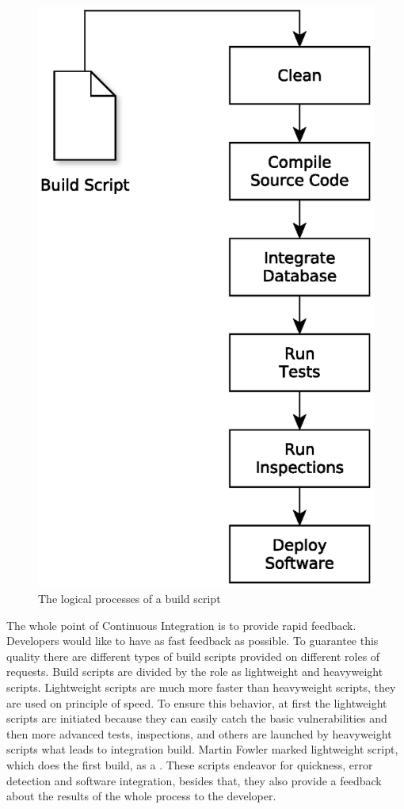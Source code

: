 \begin{figure}[H]
	\centering
	\includegraphics[scale=0.5]{yEd/the_logical_processes_of_a_build_script.eps}
	\caption{The logical processes of a build script\cite{CIPD}}
	\label{fig:lpobs}
\end{figure}

The whole point of Continuous Integration is to provide rapid feedback\cite{CIMF}. Developers would like to have as fast feedback as possible. To guarantee this quality there are different types of build scripts provided on different roles of requests. Build scripts are divided by the role as lightweight and heavyweight scripts. Lightweight scripts are much more faster than heavyweight scripts, they are used on principle of speed. To ensure this behavior, at first the lightweight scripts are initiated because they can easily catch the basic vulnerabilities and then more advanced tests, inspections, and others are launched by heavyweight scripts what leads to integration build. Martin Fowler marked lightweight script, which does the first build, as a \cite{CIMF}. These scripts endeavor for quickness, error detection and software integration, besides that, they also provide a feedback about the results of the whole process to the developer.

